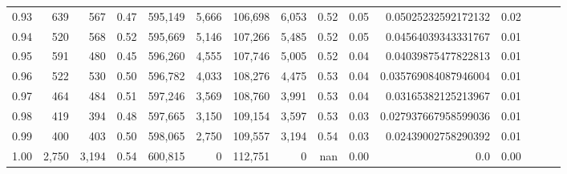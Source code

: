 \begin{tabular}{rrrrrrrrrrrrrrr}
0.93 &     639 &    567 &  0.47 &  595,149 &    5,666 &  106,698 &    6,053 &  0.52 &  0.05 &   0.05025232592172132 &      0.02 \\
0.94 &     520 &    568 &  0.52 &  595,669 &    5,146 &  107,266 &    5,485 &  0.52 &  0.05 &   0.04564039343331767 &      0.01 \\
0.95 &     591 &    480 &  0.45 &  596,260 &    4,555 &  107,746 &    5,005 &  0.52 &  0.04 &   0.04039875477822813 &      0.01 \\
0.96 &     522 &    530 &  0.50 &  596,782 &    4,033 &  108,276 &    4,475 &  0.53 &  0.04 &  0.035769084087946004 &      0.01 \\
0.97 &     464 &    484 &  0.51 &  597,246 &    3,569 &  108,760 &    3,991 &  0.53 &  0.04 &   0.03165382125213967 &      0.01 \\
0.98 &     419 &    394 &  0.48 &  597,665 &    3,150 &  109,154 &    3,597 &  0.53 &  0.03 &  0.027937667958599036 &      0.01 \\
0.99 &     400 &    403 &  0.50 &  598,065 &    2,750 &  109,557 &    3,194 &  0.54 &  0.03 &   0.02439002758290392 &      0.01 \\
1.00 &   2,750 &  3,194 &  0.54 &  600,815 &        0 &  112,751 &        0 &   nan &  0.00 &                   0.0 &      0.00 \\
\bottomrule
\end{tabular}
